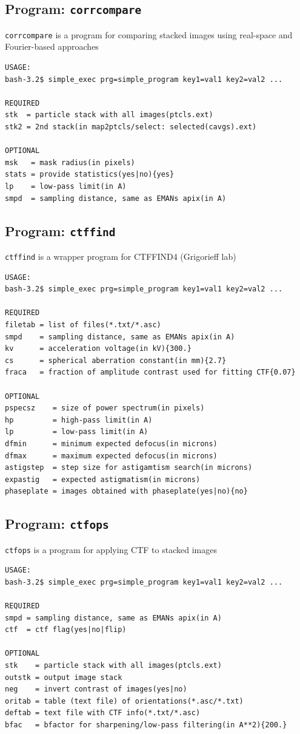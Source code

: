 \documentclass[a4paper,11pt]{article}
\newcommand{\prgname}[1]{\textcolor{NavyBlue}{\texttt{#1}}}
\begin{document}
\subsection{Program: \prgname{corrcompare}}
\label{corrcompare}
\prgname{corrcompare} is a program for comparing stacked images using real-space and Fourier-based approaches 

\begin{verbatim}
USAGE:
bash-3.2$ simple_exec prg=simple_program key1=val1 key2=val2 ...

REQUIRED
stk  = particle stack with all images(ptcls.ext)
stk2 = 2nd stack(in map2ptcls/select: selected(cavgs).ext)

OPTIONAL
msk   = mask radius(in pixels)
stats = provide statistics(yes|no){yes}
lp    = low-pass limit(in A)
smpd  = sampling distance, same as EMANs apix(in A)
\end{verbatim}

\subsection{Program: \prgname{ctffind}}
\label{ctffind}
\prgname{ctffind} is a wrapper program for CTFFIND4 (Grigorieff lab)

\begin{verbatim}
USAGE:
bash-3.2$ simple_exec prg=simple_program key1=val1 key2=val2 ...

REQUIRED
filetab = list of files(*.txt/*.asc)
smpd    = sampling distance, same as EMANs apix(in A)
kv      = acceleration voltage(in kV){300.}
cs      = spherical aberration constant(in mm){2.7}
fraca   = fraction of amplitude contrast used for fitting CTF{0.07}

OPTIONAL
pspecsz    = size of power spectrum(in pixels)
hp         = high-pass limit(in A)
lp         = low-pass limit(in A)
dfmin      = minimum expected defocus(in microns)
dfmax      = maximum expected defocus(in microns)
astigstep  = step size for astigamtism search(in microns)
expastig   = expected astigmatism(in microns)
phaseplate = images obtained with phaseplate(yes|no){no}
\end{verbatim}

\subsection{Program: \prgname{ctfops}}
\label{ctfops}
\prgname{ctfops} is a program for applying CTF to stacked images 

\begin{verbatim}
USAGE:
bash-3.2$ simple_exec prg=simple_program key1=val1 key2=val2 ...

REQUIRED
smpd = sampling distance, same as EMANs apix(in A)
ctf  = ctf flag(yes|no|flip)

OPTIONAL
stk    = particle stack with all images(ptcls.ext)
outstk = output image stack
neg    = invert contrast of images(yes|no)
oritab = table (text file) of orientations(*.asc/*.txt)
deftab = text file with CTF info(*.txt/*.asc)
bfac   = bfactor for sharpening/low-pass filtering(in A**2){200.}
\end{verbatim}
\end{document}
